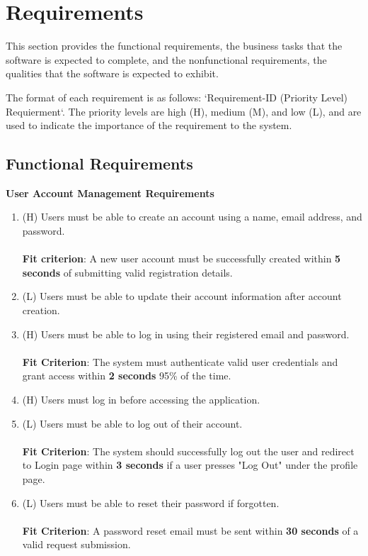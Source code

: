 \documentclass[12pt]{article}
\begin{document}
\newpage


\section{Requirements}

This section provides the functional requirements, the business tasks that the
software is expected to complete, and the nonfunctional requirements, the
qualities that the software is expected to exhibit.

The format of each requirement is as follows: `Requirement-ID (Priority Level)
Requierment`. The priority levels are high (H), medium (M), and low (L), and are
used to indicate the importance of the requirement to the system.

\subsection{Functional Requirements}\label{sec_funcReq}

\textbf{User Account Management Requirements}\label{FR-UAM}
\begin{enumerate}[label=FR-UAM-\arabic*]
  \item (H) Users must be able to create an account using a name, email
  address, and password. \\ \\ \textbf{Fit criterion}: A new user account must be successfully created within \textbf{5 seconds} of submitting valid registration details.
  \item (L) Users must be able to update their account information after account
  creation.
  \item (H) Users must be able to log in using their registered email and password.
  \\ \\ \textbf{Fit Criterion}: The system must authenticate valid user credentials and grant access within \textbf{2 seconds} 95\% of the time.
  \item (H) Users must log in before accessing the application.
  \item (L) Users must be able to log out of their account.
  \\ \\ \textbf{Fit Criterion}: The system should successfully log out the user and redirect to Login page within \textbf{3 seconds} if a user presses "Log Out" under the profile page.
  \item (L) Users must be able to reset their password if forgotten.
  \\ \\ \textbf{Fit Criterion}: A password reset email must be sent within \textbf{30 seconds} of a valid request submission.
\end{enumerate}
\end{document}
